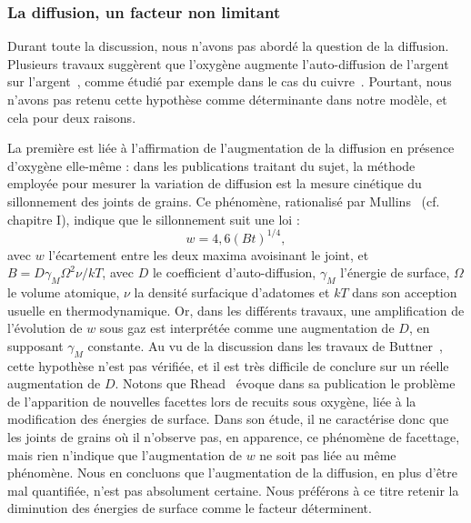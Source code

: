 			\subsubsection{La diffusion, un facteur non limitant}
Durant toute la discussion, nous n'avons pas abordé la question de la diffusion. Plusieurs travaux suggèrent que l'oxygène augmente l'auto-diffusion de l'argent sur l'argent~\cite{rhead1963surface, yoshihara1979effect}, comme étudié par exemple dans le cas du cuivre~\cite{bradshaw1964surface}. Pourtant, nous n'avons pas retenu cette hypothèse comme déterminante dans notre modèle, et cela pour deux raisons.\par 
La première est liée à l'affirmation de l'augmentation de la diffusion en présence d'oxygène elle-même : dans les publications traitant du sujet, la méthode employée pour mesurer la variation de diffusion est la mesure cinétique du sillonnement des joints de grains. Ce phénomène, rationalisé par Mullins~\cite{mullins1957theory} (cf. chapitre I), indique que le sillonnement suit une loi :
\begin{equation}
w = 4,6(Bt)^{1/4},
\end{equation}
avec $w$ l'écartement entre les deux maxima avoisinant le joint, et $B = D\gamma_M \Omega^2\nu/kT$, avec $D$ le
coefficient d'auto-diffusion, $\gamma_M $ l'énergie de surface, $\Omega$ le volume atomique, $\nu$ la densité surfacique
d'adatomes et $kT$ dans son acception usuelle en thermodynamique. Or, dans les différents travaux, une amplification de l'évolution de $w$ sous gaz est interprétée comme une augmentation de $D$, en supposant $\gamma_M$ constante. Au vu de la discussion dans les travaux de Buttner~\cite{buttner1952adsorption}, cette hypothèse n'est pas vérifiée, et il est très difficile de conclure sur un réelle augmentation de $D$. Notons que Rhead~\cite{rhead1963surface} évoque dans sa publication le problème de l'apparition de nouvelles facettes lors de recuits sous oxygène, liée à la modification des énergies de surface. Dans son étude, il ne caractérise donc que les joints de grains où il n'observe pas, en apparence, ce phénomène de facettage, mais rien n'indique que l'augmentation de $w$ ne soit pas liée au même phénomène. Nous en concluons que l'augmentation de la diffusion, en plus d'être mal quantifiée, n'est pas absolument certaine. Nous préférons à ce titre retenir la diminution des énergies de surface comme le facteur déterminent.\par 
